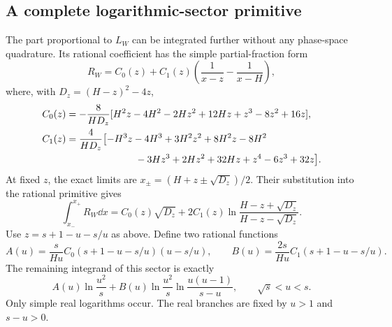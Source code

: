 \subsection{A complete logarithmic-sector primitive}
The part proportional to $L_W$ can be integrated further without
any phase-space quadrature. Its rational coefficient has the simple
partial-fraction form
\begin{equation}
 R_W=C_0(z)+C_1(z)\left(\frac1{x-z}-\frac1{x-H}\right),
\end{equation}
where, with $D_z=(H-z)^2-4z$,
\begin{align}
 C_0(z)&=-\frac8{HD_z}
       [H^2z-4H^2-2Hz^2+12Hz+z^3-8z^2+16z],\\
 C_1(z)&=\frac4{HD_z}\bigl[
       -H^3z-4H^3+3H^2z^2+8H^2z-8H^2\\
 &\hspace{25mm}{}-3Hz^3+2Hz^2+32Hz+z^4-6z^3+32z\bigr].
\end{align}
At fixed $z$, the exact limits are
$x_\pm=(H+z\pm\sqrt{D_z})/2$. Their substitution into the
rational primitive gives
\begin{equation}
 \int_{x_-}^{x_+}R_W\dd x
 =C_0(z)\sqrt{D_z}+2C_1(z)
       \ln\frac{H-z+\sqrt{D_z}}{H-z-\sqrt{D_z}}.
\end{equation}
Use $z=s+1-u-s/u$ as above. Define two rational functions
\begin{equation}
 A(u)=\frac{s}{Hu}C_0(s+1-u-s/u)(u-s/u),\qquad
 B(u)=\frac{2s}{Hu}C_1(s+1-u-s/u).
\end{equation}
The remaining integrand of this sector is exactly
\begin{equation}
 A(u)\ln\frac{u^2}{s}
 +B(u)\ln\frac{u^2}{s}\ln\frac{u(u-1)}{s-u},\qquad
 \sqrt{s}<u<s.
 \label{eq:comp-real-W-last-integrand}
\end{equation}
Only simple real logarithms occur. The real branches are fixed by
$u>1$ and $s-u>0$.

